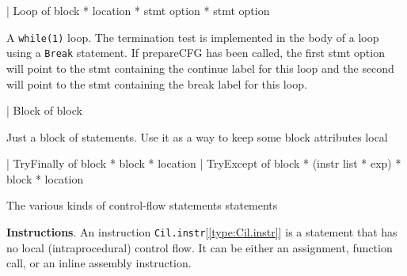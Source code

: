 \documentclass[11pt]{article}
\begin{document}
\begin{ocamldoccode}
  | Loop of block * location * stmt option * stmt option
\end{ocamldoccode}
\begin{ocamldoccomment}
A {\tt{while(1)}} loop. The termination test is implemented in the body of 
 a loop using a {\tt{Break}} statement. If prepareCFG has been called,
 the first stmt option will point to the stmt containing the continue
 label for this loop and the second will point to the stmt containing
 the break label for this loop.
\end{ocamldoccomment}
\begin{ocamldoccode}
  | Block of block
\end{ocamldoccode}
\begin{ocamldoccomment}
Just a block of statements. Use it as a way to keep some block 
 attributes local
\end{ocamldoccomment}
\begin{ocamldoccode}
  | TryFinally of block * block * location
  | TryExcept of block * (instr list * exp) * block * location
\end{ocamldoccode}
\begin{ocamldocdescription}
The various kinds of control-flow statements statements


\end{ocamldocdescription}




{\bf Instructions}. 
 An instruction {\tt{Cil.instr}}[\ref{type:Cil.instr}] is a statement that has no local
(intraprocedural) control flow. It can be either an assignment,
function call, or an inline assembly instruction.
\end{document}
